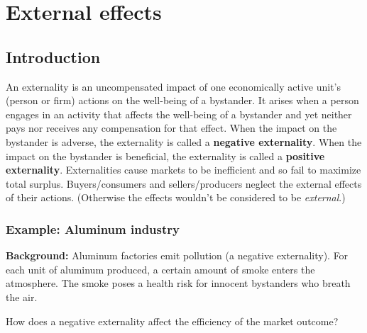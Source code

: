 \pbn
\section{External effects}\label{sec:externaleffects}

\subsection{Introduction}
An externality is an uncompensated impact of one economically active unit's (person or firm) actions on the well-being of a bystander.
It arises when a person engages in an activity that affects the well-being of a bystander and yet neither pays nor receives any compensation for that effect.
When the impact on the bystander is adverse, the externality is called a \textbf{negative externality}.
When the impact on the bystander is beneficial, the externality is called a \textbf{positive externality}.
Externalities cause markets to be inefficient and so fail to maximize total surplus. 
Buyers/consumers and sellers/producers neglect the external effects of their actions. (Otherwise the effects wouldn't be considered to be \textit{external}.)



\subsubsection*{Example: Aluminum industry}

\textbf{Background:} Aluminum factories emit pollution (a negative externality). For each unit of aluminum produced, a certain amount of smoke enters the atmosphere.
The smoke poses a health risk for innocent bystanders who breath the air.

How does a negative externality affect the efficiency of the market outcome?

